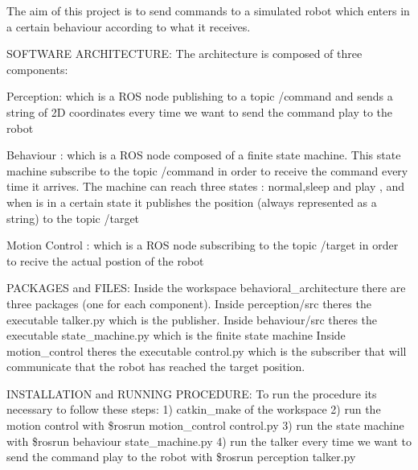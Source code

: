 The aim of this project is to send commands to a simulated robot which enters in a certain behaviour according to what it receives.

S\+O\+F\+T\+W\+A\+RE A\+R\+C\+H\+I\+T\+E\+C\+T\+U\+RE\+: The architecture is composed of three components\+:
\begin{DoxyItemize}
\item Perception\+: which is a R\+OS node publishing to a topic /command and sends a string of 2D coordinates every time we want to send the command \textquotesingle{}play\textquotesingle{} to the robot
\item Behaviour \+: which is a R\+OS node composed of a finite state machine. This state machine subscribe to the topic /command in order to receive the command every time it arrives. The machine can reach three states \+: \textquotesingle{}normal\textquotesingle{},\textquotesingle{}sleep\textquotesingle{} and \textquotesingle{}play\textquotesingle{} , and when is in a certain state it publishes the position (always represented as a string) to the topic /target
\item Motion Control \+: which is a R\+OS node subscribing to the topic /target in order to recive the actual postion of the robot
\end{DoxyItemize}

P\+A\+C\+K\+A\+G\+ES and F\+I\+L\+ES\+: Inside the workspace behavioral\+\_\+architecture there are three packages (one for each component). Inside perception/src there\textquotesingle{}s the executable talker.\+py which is the publisher. Inside behaviour/src there\textquotesingle{}s the executable state\+\_\+machine.\+py which is the finite state machine Inside motion\+\_\+control there\textquotesingle{}s the executable control.\+py which is the subscriber that will communicate that the robot has reached the target position.

I\+N\+S\+T\+A\+L\+L\+A\+T\+I\+ON and R\+U\+N\+N\+I\+NG P\+R\+O\+C\+E\+D\+U\+RE\+: To run the procedure it\textquotesingle{}s necessary to follow these steps\+: 1) catkin\+\_\+make of the workspace 2) run the motion control with \$rosrun motion\+\_\+control control.\+py 3) run the state machine with \$rosrun behaviour state\+\_\+machine.\+py 4) run the talker every time we want to send the command \textquotesingle{}play\textquotesingle{} to the robot with \$rosrun perception talker.\+py

